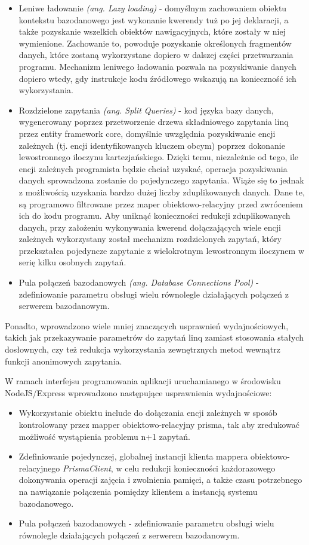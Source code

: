 \begin{itemize}
    \item Leniwe ładowanie \textit{(ang. Lazy loading)} - domyślnym zachowaniem obiektu kontekstu bazodanowego jest wykonanie kwerendy tuż po jej deklaracji, a także pozyskanie wszelkich obiektów nawigacyjnych, które zostały w niej wymienione. Zachowanie to, powoduje pozyskanie określonych fragmentów danych, które zostaną wykorzystane dopiero w dalszej części przetwarzania programu. Mechanizm leniwego ładowania pozwala na pozyskiwanie danych dopiero wtedy, gdy instrukcje kodu źródłowego wskazują na konieczność ich wykorzystania.
    \item Rozdzielone zapytania \textit{(ang. Split Queries)} - kod języka bazy danych, wygenerowany poprzez przetworzenie drzewa składniowego zapytania linq przez entity framework core, domyślnie uwzględnia pozyskiwanie encji zależnych (tj. encji identyfikowanych kluczem obcym) poprzez dokonanie lewostronnego iloczynu kartezjańskiego. Dzięki temu, niezależnie od tego, ile encji zależnych programista będzie chciał uzyskać, operacja pozyskiwania danych sprowadzona zostanie do pojedynczego zapytania. Wiąże się to jednak z możliwością uzyskania bardzo dużej liczby zduplikowanych danych. Dane te, są programowo filtrowane przez maper obiektowo-relacyjny przed zwróceniem ich do kodu programu. Aby uniknąć konieczności redukcji zduplikowanych danych, przy założeniu wykonywania kwerend dołączających wiele encji zależnych wykorzystany został mechanizm rozdzielonych zapytań, który przekształca pojedyncze zapytanie z wielokrotnym lewostronnym iloczynem w serię kilku osobnych zapytań.
    \item Pula połączeń bazodanowych \textit{(ang. Database Connections Pool)} - zdefiniowanie parametru obsługi wielu równolegle działających połączeń z serwerem bazodanowym. 
\end{itemize}

Ponadto, wprowadzono wiele mniej znaczących usprawnień wydajnościowych, takich jak przekazywanie parametrów do zapytań linq zamiast stosowania stałych dosłownych, czy też redukcja wykorzystania zewnętrznych metod wewnątrz funkcji anonimowych zapytania. 

W ramach interfejsu programowania aplikacji uruchamianego w środowisku NodeJS/Express wprowadzono następujące usprawnienia wydajnościowe:
\begin{itemize}
    \item Wykorzystanie obiektu include do dołączania encji zależnych w sposób kontrolowany przez mapper obiektowo-relacyjny prisma, tak aby zredukować możliwość wystąpienia problemu n+1 zapytań.
    \item Zdefiniowanie pojedynczej, globalnej instancji klienta mappera obiektowo-relacyjnego \textit{PrismaClient}, w celu redukcji konieczności każdorazowego dokonywania operacji zajęcia i zwolnienia pamięci, a także czasu potrzebnego na nawiązanie połączenia pomiędzy klientem a instancją systemu bazodanowego.
    \item Pula połączeń bazodanowych - zdefiniowanie parametru obsługi wielu równolegle działających połączeń z serwerem bazodanowym. 
\end{itemize}

